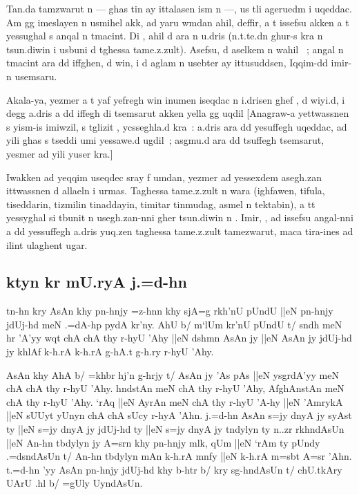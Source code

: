 \documentclass[a4paper,11pt]{article}
\begin{document}
Tan.da tamzwarut n \OMEGA{} --- ghas tin ay ittalasen ism n \OMEGA{}
---, us tli ageruedm i uqeddac. Am gg imeslayen n usmihel akk, ad yaru
wmdan ahil, deffir, a t issefsu akken a t yessughal s anqal n
tmacint. Di \OMEGA{}, ahil d ara n u.dris (n.t.te.dn ghur-s kra n
tsun.diwin i usbuni d tghessa tame.z.zult).  Asefsu, d aselkem n wahil
\OMEGA~; angal n tmacint ara dd iffghen, d win, i d aglam n usebter ay
ittusuddsen, Iqqim-dd imir-n usemsaru.

Akala-ya, yezmer a t yaf yefregh win inumen iseqdac n i.drisen ghef
, d wiyi.d, i degg a.dris a dd iffegh di
tsemsarut akken yella gg uqdil [Anagraw-a yettwassnen s yism-is
imiwzil, s tglizit , ycsseghla.d kra~: a.dris
ara dd yesuffegh uqeddac, ad yili ghas s tseddi umi yessawe.d ugdil~;
asgmu.d ara dd tsuffegh tsemsarut, yesmer ad yili yuser kra.]

Iwakken ad yeqqim useqdec sray f umdan, yezmer ad yessexdem asegh.zan
ittwassnen d allaeln i urmas. Taghessa tame.z.zult n wara (ighfawen,
tifula, tiseddarin, tizmilin tinaddayin, timitar tinmudag, asmel n
tektabin), a tt yessyghal si tbunit n usegh.zan-nni gher tsun.diwin n
\OMEGA. Imir, \OMEGA, ad issefsu angal-nni a dd yessuffegh a.dris
yuq.zen taghessa tame.z.zult tamezwarut, maca tira-ines ad ilint
ulaghent ugar.  \popocplist

\pushocplist\SindhiOCP
\subsection{ktyn kr mU.ryA j.=d-hn}


tn-hn kry AsAn khy pn-hnjy =z-hnn khy sjA=g rkh'nU pUndU ||eN pn-hnjy
jdUj-hd meN .=dA-hp pydA kr'ny. AhU b/ m`lUm kr'nU pUndU t/ sndh meN
hr 'A'yy wqt chA chA thy r-hyU 'Ahy ||eN dshmn AsAn jy ||eN AsAn jy
jdUj-hd jy khlAf k-h.rA k-h.rA g-hA.t g-h.ry r-hyU 'Ahy.


AsAn khy AhA b/ =khbr hj'n g-hrjy t/ AsAn jy 'As pAs ||eN ysgrdA'yy
meN chA chA thy r-hyU 'Ahy. hndstAn meN chA thy r-hyU 'Ahy, AfghAnstAn
meN chA thy r-hyU 'Ahy. `rAq ||eN AyrAn meN chA thy r-hyU 'A-hy ||eN
'AmrykA ||eN sUUyt yUnyn chA chA sUcy r-hyA 'Ahn. j.=d-hn AsAn s=jy
dnyA jy syAst ty ||eN s=jy dnyA jy jdUj-hd ty ||eN s=jy dnyA jy
tndylyn ty n..zr rkhndAsUn ||eN An-hn tbdylyn jy A=srn khy pn-hnjy
mlk, qUm ||eN `rAm ty pUndy .=dsndAsUn t/ An-hn tbdylyn mAn k-h.rA
mnfy ||eN k-h.rA m=sbt A=sr 'Ahn. t.=d-hn 'yy AsAn pn-hnjy jdUj-hd khy
b-htr b/ kry sg-hndAsUn t/ chU.tkAry UArU .hl b/ =gUly UyndAsUn.
\end{document}
